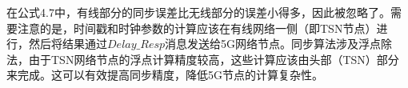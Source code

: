 \documentclass[UTF8,a4paper,12pt]{ctexart}
\numberwithin{equation}{section}
\begin{document}
在公式4.7中，有线部分的同步误差比无线部分的误差小得多，因此被忽略了。需要注意的是，时间戳和时钟参数的计算应该在有线网络一侧（即TSN节点）进行，然后将结果通过$Delay\_Resp$消息发送给5G网络节点。同步算法涉及浮点除法，由于TSN网络节点的浮点计算精度较高，这些计算应该由头部（TSN）部分来完成。这可以有效提高同步精度，降低5G节点的计算复杂性。
\begin{figure}[H] 
\end{figure}
\end{document}

